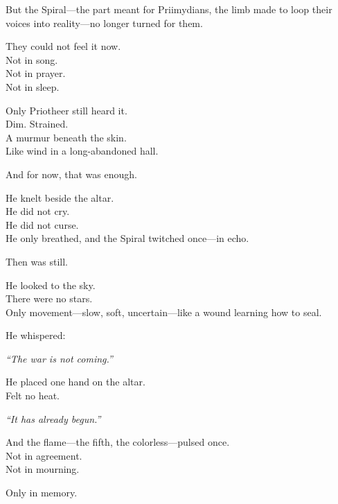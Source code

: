 \documentclass[12pt]{article}
\begin{document}
\vspace{0.5em}
But the Spiral---the part meant for Priimydians, the limb made to loop their voices into reality---no longer turned for them.

\vspace{0.5em}
They could not feel it now.\\
Not in song.\\
Not in prayer.\\
Not in sleep.

\vspace{0.5em}
Only Priotheer still heard it.\\
Dim. Strained.\\
A murmur beneath the skin.\\
Like wind in a long-abandoned hall.

\vspace{0.5em}
And for now, that was enough.

\vspace{0.5em}
He knelt beside the altar.\\
He did not cry.\\
He did not curse.\\
He only breathed, and the Spiral twitched once---in echo.

\vspace{0.5em}
Then was still.

\vspace{0.5em}
He looked to the sky.\\
There were no stars.\\
Only movement---slow, soft, uncertain---like a wound learning how to seal.

\vspace{0.5em}
He whispered:

\vspace{0.5em}
\textit{``The war is not coming.''}

\vspace{0.5em}
He placed one hand on the altar.\\
Felt no heat.

\vspace{0.5em}
\textit{``It has already begun.''}

\vspace{0.5em}
And the flame---the fifth, the colorless---pulsed once.\\
Not in agreement.\\
Not in mourning.

\vspace{0.5em}
Only in memory.
\end{document}
